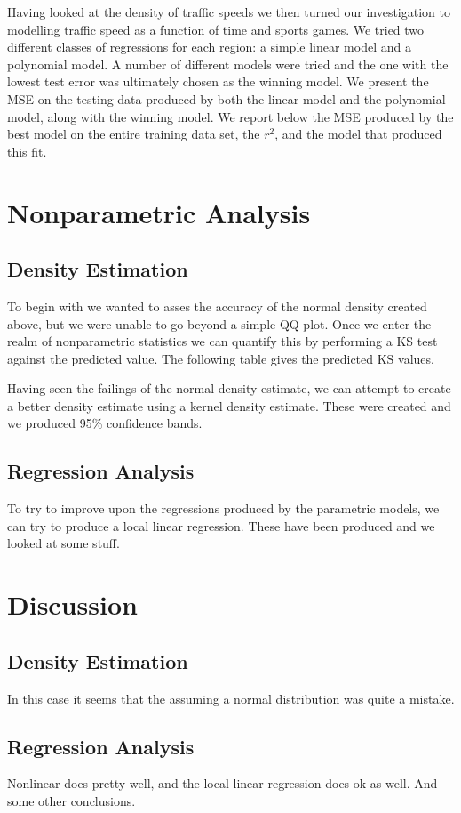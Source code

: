 \documentclass[12pt]{article}
\begin{document}
Having looked at the density of traffic speeds we then turned our investigation to modelling traffic speed as a function of time and sports games. We tried two different classes of regressions for each region: a simple linear model and a polynomial model. A number of different models were tried and the one with the lowest test error was ultimately chosen as the winning model. We present the MSE on the testing data produced by both the linear model and the polynomial model, along with the winning model. We report below the MSE produced by the best model on the entire training data set, the $r^2$, and the model that produced this fit.
\section{Nonparametric Analysis}
\subsection{Density Estimation}
To begin with we wanted to asses the accuracy of the normal density created above, but we were unable to go beyond a simple QQ plot. Once we enter the realm of nonparametric statistics we can quantify this by performing a KS test against the predicted value. The following table gives the predicted KS values.

Having seen the failings of the normal density estimate, we can attempt to create a better density estimate using a kernel density estimate. These were created and we produced 95\% confidence bands.
\subsection{Regression Analysis}
To try to improve upon the regressions produced by the parametric models, we can try to produce a local linear regression. These have been produced and we looked at some stuff.
\section{Discussion}
\subsection{Density Estimation}
In this case it seems that the assuming a normal distribution was quite a mistake. 
\subsection{Regression Analysis}
Nonlinear does pretty well, and the local linear regression does ok as well. And some other conclusions.
\end{document}
